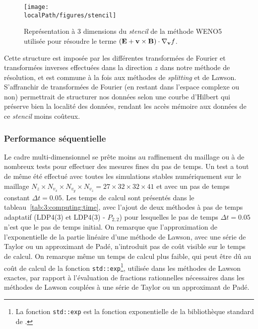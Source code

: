 \begin{figure}
  \centering
  \texttt{[image: \\localPath/figures/stencil]}
  \caption{Représentation à 3 dimensions du \emph{stencil} de la méthode WENO5 utilisée pour résoudre le terme $(\vb{E}+\vb{v}\times\vb{B})\cdot\nabla_{\vb{v}}f$.}
  \label{fig:3:stencil}
\end{figure}

Cette structure est imposée par les différentes transformées de Fourier et transformées inverses effectuées dans la direction $z$ dans notre méthode de résolution, et est commune à la fois aux méthodes de \emph{splitting} et de Lawson. S'affranchir de transformées de Fourier (en restant dans l'espace complexe ou non) permettrait de structurer nos données selon une courbe d'Hilbert qui préserve bien la localité des données, rendant les accès mémoire aux données de ce \emph{stencil} moins coûteux.

\subsubsection{Performance séquentielle}

Le cadre multi-dimensionnel se prête moins au raffinement du maillage ou à de nombreux tests pour effectuer des mesures fines du pas de temps. Un test a tout de même été effectué avec toutes les simulations stables numériquement sur le maillage $N_z \times N_{v_x} \times N_{v_y} \times N_{v_z}=27\times32\times32\times41$ et avec un pas de temps constant $\Delta t=0.05$. Les temps de calcul sont présentés dans le tableau~\ref{tab:3:computing:time}, avec l'ajout de deux méthodes à pas de temps adaptatif (LDP4(3) et LDP4(3) - $P_{2,2}$) pour lesquelles le pas de temps $\Delta t=0.05$ n'est que le pas de temps initial. On remarque que l'approximation de l'exponentielle de la partie linéaire d'une méthode de Lawson, avec une série de Taylor ou un approximant de Padé, n'introduit pas de coût visible sur le temps de calcul. On remarque même un temps de calcul plus faible, qui peut être dû au coût de calcul de la fonction \texttt{std::exp}\footnote{La fonction \CC{} \texttt{std::exp} est la fonction exponentielle de la bibliothèque standard de \CC{}.}, utilisée dans les méthodes de Lawson exactes, par rapport à l'évaluation de fractions rationnelles nécessaires dans les méthodes de Lawson couplées à une série de Taylor ou un approximant de Padé.

